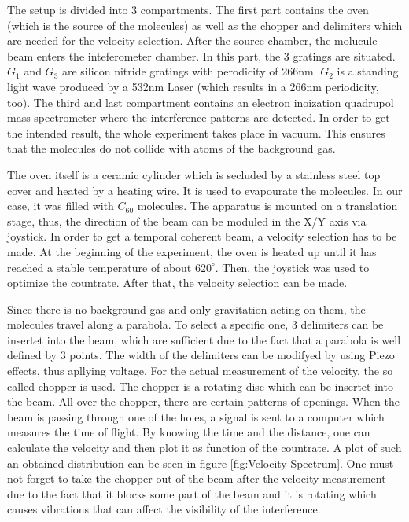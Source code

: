 \documentclass[12pt,a4paper]{article}
\begin{document}
\begin{multicols}{2}

  The setup is divided into 3 compartments. The first part contains the oven (which is the source of the molecules) as well as the chopper and delimiters which are needed for the velocity selection. 
After the source chamber, the molucule beam enters the inteferometer chamber. In this part, the 3 gratings are situated. $G_1$ and $G_3$ are silicon nitride gratings with perodicity of 266nm. $G_2$ is a standing light wave produced by a 532nm Laser (which results in a 266nm periodicity, too).
The third and last compartment contains an electron inoization quadrupol mass spectrometer where the interference patterns are detected.
In order to get the intended result, the whole experiment takes place in vacuum. This ensures that the molecules do not collide with atoms of the background gas.

The oven itself is a ceramic cylinder which is secluded by a stainless steel top cover and heated by a heating wire. It is used to evapourate the molecules. In our case, it was filled with $C_{60}$ molecules. The apparatus is mounted on a translation stage, thus, the direction of the beam can be moduled in the X/Y axis via joystick.
In order to get a temporal coherent beam, a velocity selection has to be made. 
At the beginning of the experiment, the oven is heated up until it has reached a stable temperature of about $620^\circ$. Then, the joystick was used to optimize the countrate. After that, the velocity selection can be made.

Since there is no background gas and only gravitation acting on them, the molecules travel along a parabola. To select a specific one, 3 delimiters can be insertet into the beam, which are sufficient due to the fact that a parabola is well defined by 3 points. The width of the delimiters can be modifyed by using Piezo effects, thus apllying voltage. 
For the actual measurement of the velocity, the so called chopper is used. The chopper is a rotating disc which can be insertet into the beam. All over the chopper, there are certain patterns of openings. When the beam is passing through one of the holes, a signal is sent to a computer which measures the time of flight. By knowing the time and the distance, one can calculate the velocity and then plot it as function of the countrate. A plot of such an obtained distribution can be seen in figure \ref{fig:Velocity Spectrum}. One must not forget to take the chopper out of the beam after the velocity measurement due to the fact that it blocks some part of the beam and it is rotating which causes vibrations that can affect the visibility of the interference.


\end{multicols}
\end{document}
